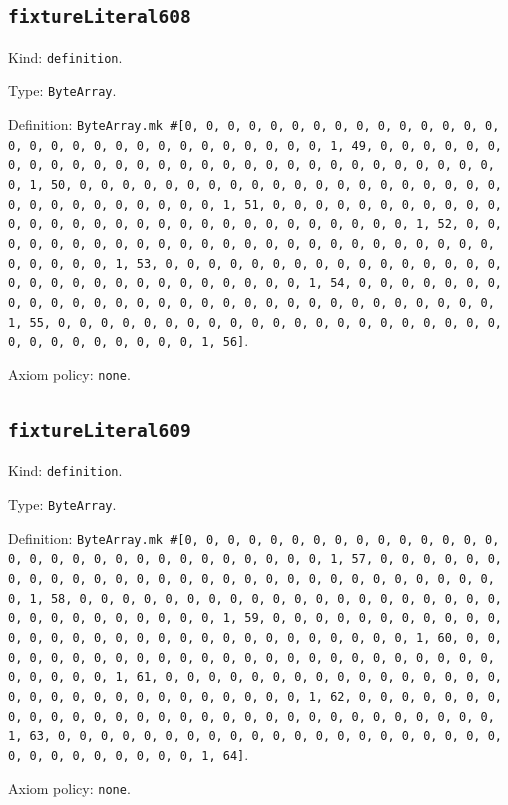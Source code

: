 \documentclass[11pt]{article}
\begin{document}
\subsection*{\texttt{fixtureLiteral608}}
\noindent Kind: \texttt{definition}.\par
\noindent Type: \texttt{ByteArray}.\par
\noindent Definition: \texttt{ByteArray.mk \#[0, 0, 0, 0, 0, 0, 0, 0, 0, 0, 0, 0, 0, 0, 0, 0, 0, 0, 0, 0, 0, 0, 0, 0, 0, 0, 0, 0, 0, 0, 1, 49, 0, 0, 0, 0, 0, 0, 0, 0, 0, 0, 0, 0, 0, 0, 0, 0, 0, 0, 0, 0, 0, 0, 0, 0, 0, 0, 0, 0, 0, 0, 1, 50, 0, 0, 0, 0, 0, 0, 0, 0, 0, 0, 0, 0, 0, 0, 0, 0, 0, 0, 0, 0, 0, 0, 0, 0, 0, 0, 0, 0, 0, 0, 1, 51, 0, 0, 0, 0, 0, 0, 0, 0, 0, 0, 0, 0, 0, 0, 0, 0, 0, 0, 0, 0, 0, 0, 0, 0, 0, 0, 0, 0, 0, 0, 1, 52, 0, 0, 0, 0, 0, 0, 0, 0, 0, 0, 0, 0, 0, 0, 0, 0, 0, 0, 0, 0, 0, 0, 0, 0, 0, 0, 0, 0, 0, 0, 1, 53, 0, 0, 0, 0, 0, 0, 0, 0, 0, 0, 0, 0, 0, 0, 0, 0, 0, 0, 0, 0, 0, 0, 0, 0, 0, 0, 0, 0, 0, 0, 1, 54, 0, 0, 0, 0, 0, 0, 0, 0, 0, 0, 0, 0, 0, 0, 0, 0, 0, 0, 0, 0, 0, 0, 0, 0, 0, 0, 0, 0, 0, 0, 1, 55, 0, 0, 0, 0, 0, 0, 0, 0, 0, 0, 0, 0, 0, 0, 0, 0, 0, 0, 0, 0, 0, 0, 0, 0, 0, 0, 0, 0, 0, 0, 1, 56]}.\par
\noindent Axiom policy: \texttt{none}.\par
\subsection*{\texttt{fixtureLiteral609}}
\noindent Kind: \texttt{definition}.\par
\noindent Type: \texttt{ByteArray}.\par
\noindent Definition: \texttt{ByteArray.mk \#[0, 0, 0, 0, 0, 0, 0, 0, 0, 0, 0, 0, 0, 0, 0, 0, 0, 0, 0, 0, 0, 0, 0, 0, 0, 0, 0, 0, 0, 0, 1, 57, 0, 0, 0, 0, 0, 0, 0, 0, 0, 0, 0, 0, 0, 0, 0, 0, 0, 0, 0, 0, 0, 0, 0, 0, 0, 0, 0, 0, 0, 0, 1, 58, 0, 0, 0, 0, 0, 0, 0, 0, 0, 0, 0, 0, 0, 0, 0, 0, 0, 0, 0, 0, 0, 0, 0, 0, 0, 0, 0, 0, 0, 0, 1, 59, 0, 0, 0, 0, 0, 0, 0, 0, 0, 0, 0, 0, 0, 0, 0, 0, 0, 0, 0, 0, 0, 0, 0, 0, 0, 0, 0, 0, 0, 0, 1, 60, 0, 0, 0, 0, 0, 0, 0, 0, 0, 0, 0, 0, 0, 0, 0, 0, 0, 0, 0, 0, 0, 0, 0, 0, 0, 0, 0, 0, 0, 0, 1, 61, 0, 0, 0, 0, 0, 0, 0, 0, 0, 0, 0, 0, 0, 0, 0, 0, 0, 0, 0, 0, 0, 0, 0, 0, 0, 0, 0, 0, 0, 0, 1, 62, 0, 0, 0, 0, 0, 0, 0, 0, 0, 0, 0, 0, 0, 0, 0, 0, 0, 0, 0, 0, 0, 0, 0, 0, 0, 0, 0, 0, 0, 0, 1, 63, 0, 0, 0, 0, 0, 0, 0, 0, 0, 0, 0, 0, 0, 0, 0, 0, 0, 0, 0, 0, 0, 0, 0, 0, 0, 0, 0, 0, 0, 0, 1, 64]}.\par
\noindent Axiom policy: \texttt{none}.\par
\end{document}
